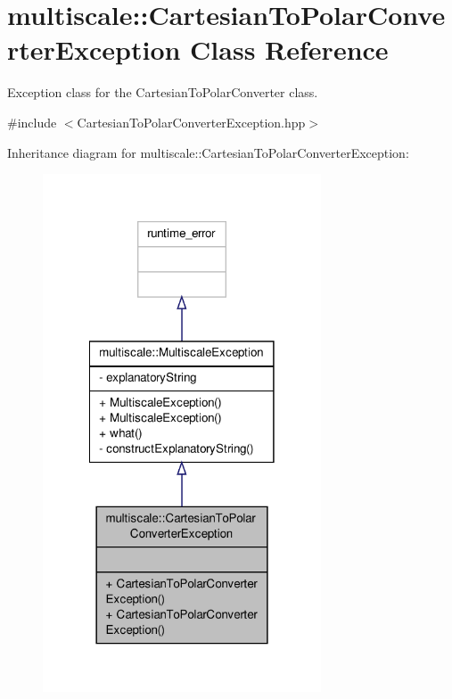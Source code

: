 \hypertarget{classmultiscale_1_1CartesianToPolarConverterException}{\section{multiscale\-:\-:Cartesian\-To\-Polar\-Converter\-Exception Class Reference}
\label{classmultiscale_1_1CartesianToPolarConverterException}
}


Exception class for the Cartesian\-To\-Polar\-Converter class.  




{\ttfamily \#include $<$Cartesian\-To\-Polar\-Converter\-Exception.\-hpp$>$}



Inheritance diagram for multiscale\-:\-:Cartesian\-To\-Polar\-Converter\-Exception\-:
\nopagebreak
\begin{figure}[H]
\begin{center}
\leavevmode
\includegraphics[width=234pt]{classmultiscale_1_1CartesianToPolarConverterException__inherit__graph}
\end{center}
\end{figure}


